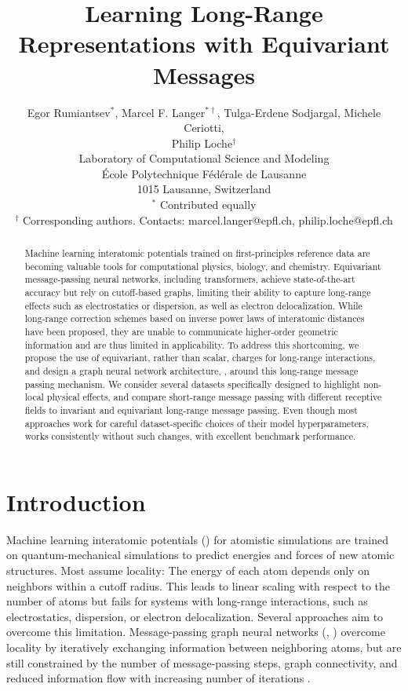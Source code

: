 \documentclass[10pt]{article} %
\title{Learning Long-Range Representations with Equivariant Messages}
\author{\name Egor Rumiantsev$^*$, Marcel F. Langer$^{*\dagger}$, Tulga-Erdene Sodjargal,  Michele Ceriotti, \\ 
Philip Loche$^\dagger$ \\
\addr Laboratory of Computational Science and Modeling\\
École Polytechnique Fédérale de Lausanne\\
1015 Lausanne, Switzerland\\
$^*$ Contributed equally\\ 
$^\dagger$ Corresponding authors. Contacts: marcel.langer@epfl.ch, philip.loche@epfl.ch
}
\newcommand{\CL}[1]{#1}
\begin{document}
\maketitle

\begin{abstract}
Machine learning interatomic potentials trained on first-principles reference data are becoming valuable tools for computational physics, biology, and chemistry.
Equivariant message-passing neural networks, including transformers, achieve state-of-the-art accuracy but rely on cutoff-based graphs, limiting their ability to capture long-range effects such as electrostatics or dispersion, as well as electron delocalization.
While long-range correction schemes based on inverse power laws of interatomic distances have been proposed, they are unable to communicate higher-order geometric information and are thus limited in applicability.
To address this shortcoming, we propose the use of equivariant, rather than scalar, charges for long-range interactions, and design a graph neural network architecture, \lorem, around this long-range message passing mechanism.
We consider several datasets specifically designed to highlight non-local physical effects, and compare short-range message passing with different receptive fields to invariant and equivariant long-range message passing.
Even though most approaches work for careful dataset-specific choices of their model hyperparameters, \lorem{} \CL{works consistently without such changes, with excellent benchmark performance}.
\end{abstract}

\section{Introduction}

Machine learning interatomic potentials (\mlps) for atomistic simulations are trained on quantum-mechanical simulations to predict energies and forces of new atomic structures. Most \mlps assume locality: The energy of each atom depends only on neighbors within a cutoff radius. This leads to linear scaling with respect to the number of atoms but fails for systems with long-range interactions, such as electrostatics, dispersion, or electron delocalization. \citep{bp2007,kfgb2021,ts2009,gc2019,ucsgpstm2021,hlhc2023}
%
Several approaches aim to overcome this limitation.
Message-passing graph neural networks (\mpnns, \cite{gsrvd2017}) overcome locality by iteratively exchanging information between neighboring atoms, but are still constrained by the number of message-passing steps, graph connectivity, and reduced information flow with increasing number of iterations \citep{cw2020,ay2020,npfc2022}.
\end{document}
